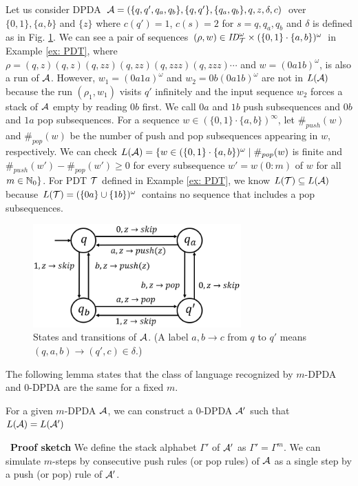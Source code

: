 \begin{example}
\label{ex: PDA}
Let us consider DPDA
${\cal A} = (\{q,q',q_a,q_b\},\{q,q'\},\{q_a,q_b\},q,z,\delta,c)$
over $\{0,1\},\{a,b\}$ and $\{z\}$ where
$c(q')=1$, $c(s)=2$ for $s=q,q_a,q_b$ and
$\delta$ is defined as in Fig. \ref{fig: PDA}.
We can see
a pair of sequences $(\rho,w)\in \mathit{ID}_{\cal T}^\omega\times (\{0,1\}\cdot\{a,b\})^\omega$ in Example \ref{ex: PDT},
where $\rho=(q,z)(q,z)(q,zz)(q,zz)(q,zzz)(q,zzz)\cdots$
and $w=(0a1b)^\omega$,
is also a run of ${\cal A}$.
However, $w_1=(0a1a)^\omega$ and $w_2=0b(0a1b)^\omega$
are not in $L({\cal A})$ because
the run $(\rho_1,w_1)$ visits $q'$ infinitely and
the input sequence $w_2$ forces a stack of ${\cal A}$ empty
by reading $0b$ first.
We call $0a$ and $1b$ push subsequences and $0b$ and $1a$ pop subsequences.
For a sequence $w\in(\{0,1\}\cdot\{a,b\})^\infty$,
let $\#_{push}(w)$ and $\#_{pop}(w)$ be the number of
push and pop subsequences appearing in $w$, respectively.
We can check
$L({\cal A})=\{w\in(\{0,1\}\cdot\{a,b\})^\omega\mid
\#_{pop}(w)$ is finite and
$\#_{push}(w')-\#_{pop}(w')\geq 0$
for every subsequence $w'=w(0:m)$ of $w$ for all $m\in\mathbb{N}_0\}$.
For PDT ${\cal T}$ defined in Example \ref{ex: PDT},
we know $L({\cal T})\subseteq L({\cal A})$
because $L({\cal T})=(\{0a\}\cup\{1b\})^\omega$ contains no sequence that includes a pop subsequences.
\end{example}
\begin{figure}[t]
  \centering
  \includegraphics[width=8cm]{PDA.png}
  \caption{States and transitions of ${\cal A}$.
  (A label $a,b \to c$ from $q$ to $q'$ means
  $(q,a,b)\to(q',c)\in\delta$.)}
  \label{fig: PDA}
\end{figure}

The following lemma states that
the class of language recognized by $m$-DPDA and $0$-DPDA are the same
for a fixed $m$.
\begin{lemma}
\label{lem: ef}
For a given $m$-DPDA ${\cal A}$,
we can construct a $0$-DPDA ${\cal A}'$ such that
$L({\cal A})=L({\cal A}')$
\end{lemma}\
{\bf Proof sketch}\quad
We define the stack alphabet $\Gamma'$ of ${\cal A}'$ as $\Gamma'=\Gamma^m$.
We can simulate $m$-steps by consecutive push rules (or pop rules) of ${\cal A}$
as a single step by a push (or pop) rule of ${\cal A}'$.

